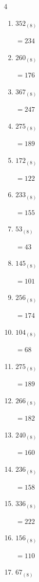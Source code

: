 \begin{multicols}{4}
\begin{enumerate}
  \item $352_{(8)}$

        $=234$

  \item $260_{(8)}$

        $=176$

  \item $367_{(8)}$

        $=247$

  \item $275_{(8)}$

        $=189$

  \item $172_{(8)}$

        $=122$

  \item $233_{(8)}$

        $=155$

  \item $53_{(8)}$

        $=43$

  \item $145_{(8)}$

        $=101$

  \item $256_{(8)}$

        $=174$

\columnbreak %

  \item $104_{(8)}$

        $=68$

  \item $275_{(8)}$

        $=189$

  \item $266_{(8)}$

        $=182$

  \item $240_{(8)}$

        $=160$

  \item $236_{(8)}$

        $=158$

  \item $336_{(8)}$

        $=222$

  \item $156_{(8)}$

        $=110$

  \item $67_{(8)}$


\end{enumerate}
\end{multicols}
